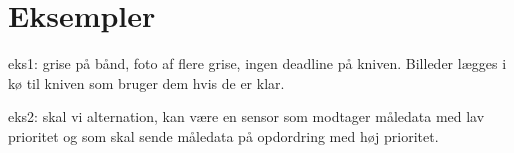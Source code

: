 \section{Eksempler}
eks1: grise på bånd, foto af flere grise, ingen deadline på kniven. Billeder lægges i kø til kniven som bruger dem hvis de er klar. 

eks2: skal vi alternation, kan være en sensor som modtager måledata med lav prioritet og som skal sende måledata på opdordring med høj prioritet. 


